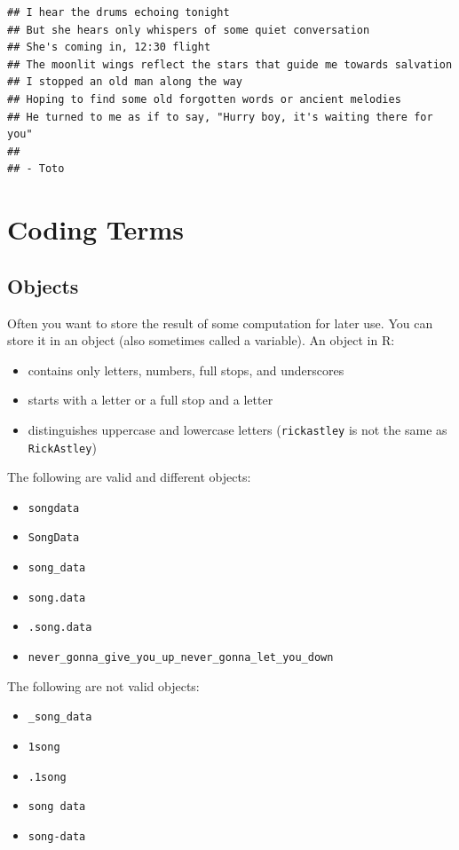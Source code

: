 \documentclass[
  oneside]{book}
\providecommand{\tightlist}{%
  \setlength{\itemsep}{0pt}\setlength{\parskip}{0pt}}
\begin{document}
\begin{verbatim}
## I hear the drums echoing tonight  
## But she hears only whispers of some quiet conversation  
## She's coming in, 12:30 flight  
## The moonlit wings reflect the stars that guide me towards salvation  
## I stopped an old man along the way  
## Hoping to find some old forgotten words or ancient melodies  
## He turned to me as if to say, "Hurry boy, it's waiting there for you"
## 
## - Toto
\end{verbatim}

\hypertarget{coding-terms}{%
\section{Coding Terms}\label{coding-terms}}

\hypertarget{vars}{%
\subsection{Objects}\label{vars}}

Often you want to store the result of some computation for later use. You can store it in an object (also sometimes called a variable). An object in R:

\begin{itemize}
\tightlist
\item
  contains only letters, numbers, full stops, and underscores
\item
  starts with a letter or a full stop and a letter
\item
  distinguishes uppercase and lowercase letters (\texttt{rickastley} is not the same as \texttt{RickAstley})
\end{itemize}

The following are valid and different objects:

\begin{itemize}
\tightlist
\item
  \texttt{songdata}
\item
  \texttt{SongData}
\item
  \texttt{song\_data}
\item
  \texttt{song.data}
\item
  \texttt{.song.data}
\item
  \texttt{never\_gonna\_give\_you\_up\_never\_gonna\_let\_you\_down}
\end{itemize}

The following are not valid objects:

\begin{itemize}
\tightlist
\item
  \texttt{\_song\_data}
\item
  \texttt{1song}
\item
  \texttt{.1song}
\item
  \texttt{song\ data}
\item
  \texttt{song-data}
\end{itemize}
\end{document}
